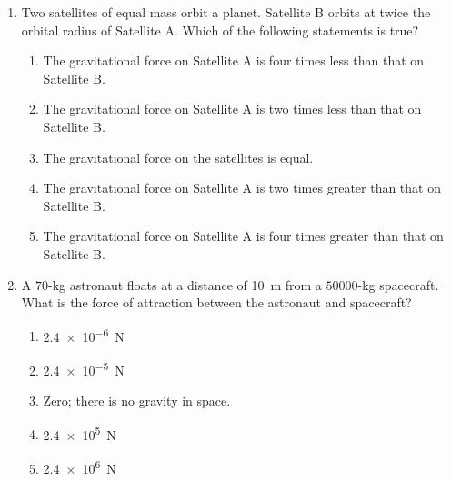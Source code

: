\documentclass{../../oss-apphys}
\begin{document}
\begin{multicols}{2}
\begin{enumerate}[leftmargin=18pt]
%
  
  \item Two satellites of equal mass orbit a planet. Satellite B orbits at twice
    the orbital radius of Satellite A. Which of the following statements is
    true?
    \begin{enumerate}[noitemsep,topsep=0pt,leftmargin=18pt,label=(\Alph*)]
    \item The gravitational force on Satellite A is four times less than that on
      Satellite B.
    \item The gravitational force on Satellite A is two times less than that on
      Satellite B.
    \item The gravitational force on the satellites is equal.
    \item The gravitational force on Satellite A is two times greater than that
      on Satellite B.
    \item The gravitational force on Satellite A is four times greater than that
      on Satellite B.
    \end{enumerate}
    
  \item A $70$-\si{\kilo\gram} astronaut floats at a distance of \SI{10}{\metre}
    from a $50000$-\si{\kilo\gram} spacecraft. What is the force of attraction
    between the astronaut and spacecraft?
    \begin{enumerate}[noitemsep,topsep=0pt,leftmargin=18pt,label=(\Alph*)]
    \item\SI{2.4e-6}{\newton}
    \item\SI{2.4e-5}{\newton}
    \item Zero; there is no gravity in space.
    \item\SI{2.4e5}{\newton}
    \item\SI{2.4e6}{\newton}
    \end{enumerate}
    

\end{enumerate}
\end{multicols}
\end{document}
